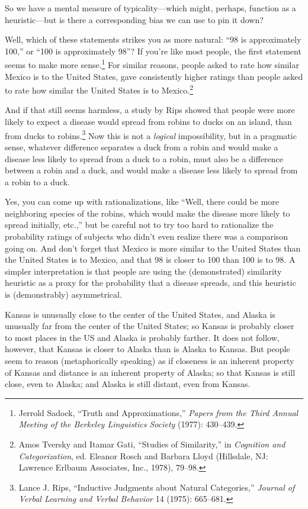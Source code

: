 { So we have a mental measure of typicality---which might, perhaps,
function as a heuristic---but is there a corresponding bias we can use
to pin it down?

{
 Well, which of these statements strikes you as more natural:
``98 is approximately 100,'' or
``100 is approximately 98''? If
you're like most people, the first statement seems to
make more sense.\footnote{Jerrold Sadock, ``Truth and
Approximations,'' \textit{Papers from the Third
Annual Meeting of the Berkeley Linguistics Society} (1977): 430--439.} For similar reasons, people asked
to rate how similar Mexico is to the United States, gave consistently
higher ratings than people asked to rate how similar the United States
is to Mexico.\footnote{Amos Tversky and Itamar Gati, ``Studies of
Similarity,'' in \textit{Cognition and
Categorization}, ed. Eleanor Rosch and Barbara Lloyd (Hillsdale, NJ:
Lawrence Erlbaum Associates, Inc., 1978), 79--98.}}


 And if that still seems harmless, a study by Rips showed that
people were more likely to expect a disease would spread from robins to
ducks on an island, than from ducks to robins.\footnote{Lance J. Rips, ``Inductive Judgments about
Natural Categories,'' \textit{Journal of Verbal
Learning and Verbal Behavior} 14 (1975): 665--681.} Now
this is not a \textit{logical} impossibility, but in a pragmatic sense,
whatever difference separates a duck from a robin and would make a
disease less likely to spread from a duck to a robin, must also be a
difference between a robin and a duck, and would make a disease less
likely to spread from a robin to a duck.


 Yes, you can come up with rationalizations, like
``Well, there could be more neighboring species of the
robins, which would make the disease more likely to spread initially,
etc.,'' but be careful not to try too hard to
rationalize the probability ratings of subjects who
didn't even realize there was a comparison going on.
And don't forget that Mexico is more similar to the
United States than the United States is to Mexico, and that 98 is
closer to 100 than 100 is to 98. A simpler interpretation is that
people are using the (demonstrated) similarity heuristic as a proxy for
the probability that a disease spreads, and this heuristic is
(demonstrably) asymmetrical.


 Kansas is unusually close to the center of the United States, and
Alaska is unusually far from the center of the United States; so Kansas
is probably closer to most places in the US and Alaska is probably
farther. It does not follow, however, that Kansas is closer to Alaska
than is Alaska to Kansas. But people seem to reason (metaphorically
speaking) as if closeness is an inherent property of Kansas and
distance is an inherent property of Alaska; so that Kansas is still
close, even to Alaska; and Alaska is still distant, even from Kansas.


}
